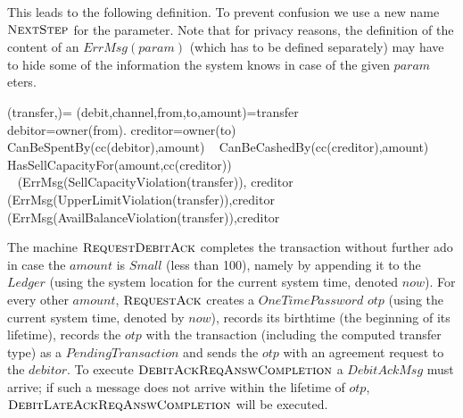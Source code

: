 This leads to the following definition. To prevent confusion we use a new name 
$\hbox{\sc NextStep}$ for the parameter. Note that for privacy reasons, the definition of the content of an $ErrMsg(param)$ (which has to be defined separately) may have to hide some of the information the system knows in case of the given $param$eters.

\begin{asm}
               (transfer,)= \+
  \LET (debit,channel,from,to,amount)=transfer \\
  \LET debitor=owner(from). creditor=owner(to)\\
  \IF CanBeSpentBy(cc(debitor),amount) \+
    \THEN ~ \IF CanBeCashedBy(cc(creditor),amount) \+
       \THEN ~ \IF HasSellCapacityFor(amount,cc(creditor)) \+
           \THEN ~  \\
           \ELSE~
           (ErrMsg(SellCapacityViolation(transfer)),
                               \TO creditor\-
       \ELSE~
       (ErrMsg(UpperLimitViolation(transfer)),\TO creditor\-
   \ELSE 
    ~ (ErrMsg(AvailBalanceViolation(transfer)),\TO creditor
\end{asm}


The machine  $\hbox{\sc RequestDebitAck}$ completes the transaction without further 
ado in case  the $amount$ is $Small$ (less than 100), namely 
by appending it to the $Ledger$ (using the system location 
for the current system time, denoted $now$). For every other 
$amount$, $\hbox{\sc RequestAck}$ creates a $OneTimePassword$ 
$otp$ (using the current system time, denoted by $now$), 
records its birthtime (the beginning of its lifetime), 
records the $otp$ with the transaction (including the 
computed transfer type) as a $PendingTransaction$ and sends 
the $otp$  with an agreement request to the $debitor$. To 
execute $\hbox{\sc DebitAckReqAnswCompletion}$ a $DebitAckMsg$ must 
arrive; if such a message does not arrive within the 
lifetime of $otp$, $\hbox{\sc DebitLateAckReqAnswCompletion}$ will be 
executed.


